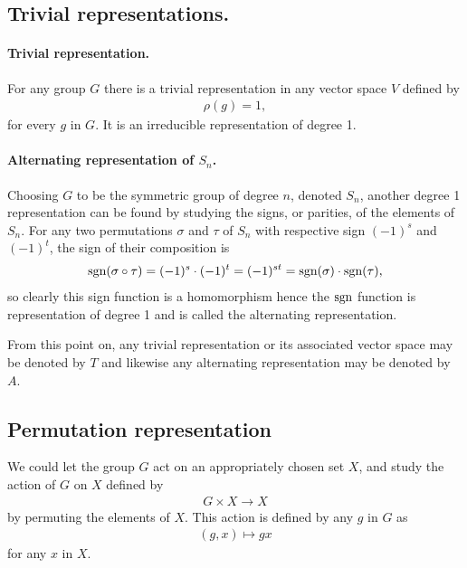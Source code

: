 \subsection{Trivial representations.}\label{sect:trivrepr}

\paragraph{Trivial representation.}


		For any group $G$ there is a trivial representation in any vector space $V$ defined by 
	\begin{align}
		\rho(g) = 1,
	\end{align}
	for every $g$ in $G$. It is an irreducible representation of degree 1. 

\paragraph{Alternating representation of $S_n$.}

	Choosing $G$ to be the symmetric group of degree $n$, denoted $S_n$, another degree 1 representation can be found by studying the signs, or parities, of the elements of $S_n$. For any two permutations $\sigma$ and $\tau$ of $S_n$ with respective sign $(-1)^s$ and $(-1)^t$, the sign of their composition is 
	\begin{align}
		\text{sgn}(\sigma \circ \tau) = (-1)^s \cdot (-1)^t = (-1)^{st} = \text{sgn}(\sigma) \cdot \text{sgn}(\tau),
	\end{align}
	so clearly this sign function is a homomorphism hence the $\text{sgn}$ function is representation of degree 1 and is called the alternating representation.	

\begin{notation}
	From this point on, any trivial representation or its associated vector space may be denoted by $T$ and likewise any alternating representation may be denoted by $A$.
\end{notation}
	

\subsection{Permutation representation}

	We could let the group $G$ act on an appropriately chosen set $X$, and study the action of $G$ on $X$ defined by
	\begin{align}
		G \times X \rightarrow X
	\end{align} 
	by permuting the elements of $X$. This action is defined by any $g$ in $G$ as 
	\begin{align}
		(g,x) \mapsto gx
	\end{align}
	for any $x$ in $X$.
	
